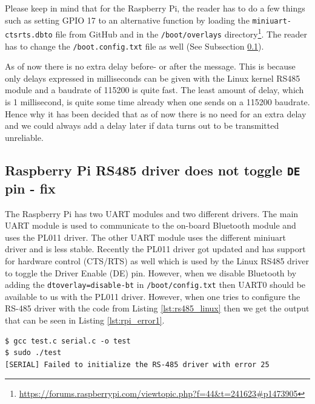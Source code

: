 Please keep in mind that for the Raspberry Pi, the reader has to do a few things such as setting GPIO 17 to an alternative function by loading the \texttt{miniuart-ctsrts.dbto} file from GitHub and in the \texttt{/boot/overlays} directory\footnote{\url{https://forums.raspberrypi.com/viewtopic.php?f=44\&t=241623\#p1473905}}.
The reader has to change the \texttt{/boot.config.txt} file as well (See Subsection \ref{subsec:rpitogglefix}). \newline

As of now there is no extra delay before- or after the message. This is because only delays expressed in milliseconds can be given with the Linux kernel RS485 module and a baudrate of 115200 is quite fast. The least amount of delay, which is 1 millisecond, is quite some time already when one sends on a 115200 baudrate.
Hence why it has been decided that as of now there is no need for an extra delay and we could always add a delay later if data turns out to be transmitted unreliable.

\newpage

\subsection{Raspberry Pi RS485 driver does not toggle \texttt{DE} pin - fix}
\label{subsec:rpitogglefix}

The Raspberry Pi has two UART modules and two different drivers. The main UART module is used to communicate to the on-board Bluetooth module and uses the PL011 driver. The other UART module uses the different miniuart driver and is less stable.
Recently the PL011 driver got updated and has support for hardware control (CTS/RTS) as well which is used by the Linux RS485 driver to toggle the Driver Enable (DE) pin.
However, when we disable Bluetooth by adding the \texttt{dtoverlay=disable-bt} in \texttt{/boot/config.txt} then UART0 should be available to us with the PL011 driver.
However, when one tries to configure the RS-485 driver with the code from Listing \ref{lst:rs485_linux} then we get the output that can be seen in Listing \ref{lst:rpi_error1}.

\begin{lstlisting}[caption={Output when one tries to communicate to \texttt{/dev/ttyAMA0} and Bluetooth is disabled}, captionpos=b, label={lst:rpi_error1}, basicstyle=\small, style=dos]
$ gcc test.c serial.c -o test
$ sudo ./test
[SERIAL] Failed to initialize the RS-485 driver with error 25
\end{lstlisting}


